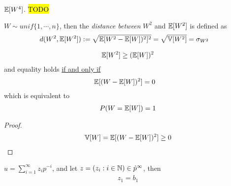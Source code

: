 \documentclass{article}
\begin{document}
   	\begin{proposition}
   		$\mathbb{E}[{W^4}]$. \hl{TODO}
   	\end{proposition}
   	
   	\begin{definition}
   		$W \sim unif\{1, \cdots, n\}$, then the \emph{distance between} $W^2$ and $\mathbb{E}[{W^2}]$ is defined as
   		\begin{align}
   			d(W^2, \mathbb{E}[{W^2}]) &:= \sqrt{\mathbb{E}[{W^2 - \mathbb{E}[{W}])^2}]^2} = \sqrt{\mathbb{V}[{W^2}]} = \sigma_{W^2}
   		\end{align}
   	\end{definition}
   	
   	\begin{corollary}
   		\begin{align}
   			\mathbb{E}[{W^2}] \geq (\mathbb{E}[{W}])^2
   		\end{align}
   		and equality holds \ul{if and only if}
   		\begin{align}
   			\mathbb{E}[{(W - \mathbb{E}[{W}])^2}] &= 0
   		\end{align}
   		which is equivalent to
   		\begin{align}
   			P(W = \mathbb{E}[{W}]) = 1
   		\end{align}
   	\end{corollary}
   	\begin{proof}
   		\begin{align}
	   		\mathbb{V}[{W}] = \mathbb{E}[{(W - \mathbb{E}[{W}])^2}] \geq 0
   		\end{align}
   	\end{proof}
   	
   	\begin{lemma}
   		$u = \sum_{i=1}^\infty z_i p^{-i}$, and let $z = (z_i: i \in \mathbb{N}) \in \dot{p}^\infty$, then 
   		\begin{align}
   			z_1 = b_1
   		\end{align}
   	\end{lemma}
\end{document}
